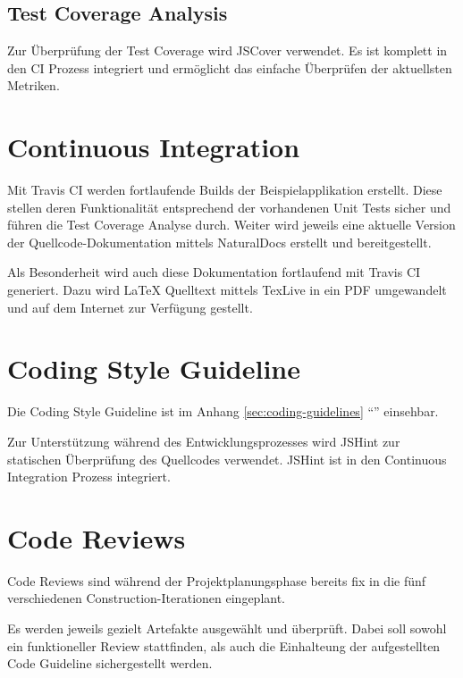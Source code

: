\subsection{Test Coverage Analysis}
Zur Überprüfung der Test Coverage wird JSCover \cite{JSCover} verwendet. Es ist komplett in den \gls{CI} Prozess integriert und ermöglicht das einfache Überprüfen der aktuellsten Metriken.


\section{Continuous Integration}
\label{sec:continuousintegration}

Mit Travis CI \cite{TravisCI} werden fortlaufende Builds der Beispielapplikation erstellt. Diese stellen deren Funktionalität entsprechend der vorhandenen Unit Tests sicher und führen die Test Coverage Analyse durch.
Weiter wird jeweils eine aktuelle Version der Quellcode-Dokumentation mittels NaturalDocs erstellt und bereitgestellt.

Als Besonderheit wird auch diese Dokumentation fortlaufend mit Travis CI generiert. Dazu wird LaTeX Quelltext mittels TexLive in ein PDF umgewandelt und auf dem Internet zur Verfügung gestellt.

\section{Coding Style Guideline}
Die Coding Style Guideline ist im Anhang \ref{sec:coding-guidelines} ``'' einsehbar.

Zur Unterstützung während des Entwicklungsprozesses wird JSHint \cite{JSHint} zur statischen Überprüfung des Quellcodes verwendet. JSHint ist in den Continuous Integration Prozess integriert.


\section{Code Reviews}
Code Reviews sind während der Projektplanungsphase bereits fix in die fünf verschiedenen Construction-Iterationen eingeplant.

Es werden jeweils gezielt Artefakte ausgewählt und überprüft. Dabei soll sowohl ein funktioneller Review stattfinden, als auch die Einhalteung der aufgestellten Code Guideline sichergestellt werden.